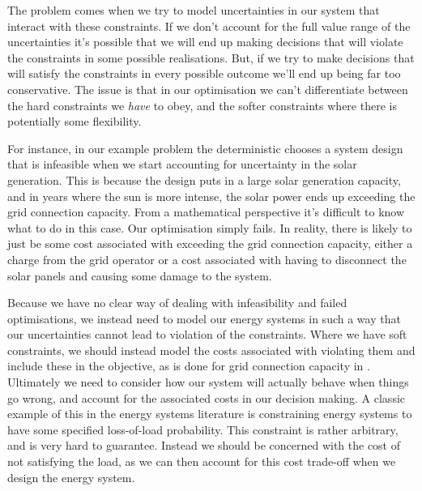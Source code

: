 \begin{subappendices}
The problem comes when we try to model uncertainties in our system that interact with these constraints. If we don't account for the full value range of the uncertainties it's possible that we will end up making decisions that will violate the constraints in some possible realisations. But, if we try to make decisions that will satisfy the constraints in every possible outcome we'll end up being far too conservative. The issue is that in our optimisation we can't differentiate between the hard constraints we \textit{have} to obey, and the softer constraints where there is potentially some flexibility.

For instance, in our example problem the deterministic  chooses a system design that is infeasible when we start accounting for uncertainty in the solar generation. This is because the design puts in a large solar generation capacity, and in years where the sun is more intense, the solar power ends up exceeding the grid connection capacity. From a mathematical perspective it's difficult to know what to do in this case. Our optimisation simply fails. In reality, there is likely to just be some cost associated with exceeding the grid connection capacity, either a charge from the grid operator \citep{frontiereconomics2022NetworkTariffsEnergy} or a cost associated with having to disconnect the solar panels and causing some damage to the system.

Because we have no clear way of dealing with infeasibility and failed optimisations, we instead need to model our energy systems in such a way that our uncertainties cannot lead to violation of the constraints. Where we have soft constraints, we should instead model the costs associated with violating them and include these in the objective, as is done for grid connection capacity in . Ultimately we need to consider how our system will actually behave when things go wrong, and account for the associated costs in our decision making. A classic example of this in the energy systems literature is constraining energy systems to have some specified loss-of-load probability. This constraint is rather arbitrary, and is very hard to guarantee. Instead we should be concerned with the cost of not satisfying the load, as we can then account for this cost trade-off when we design the energy system.

\end{subappendices}